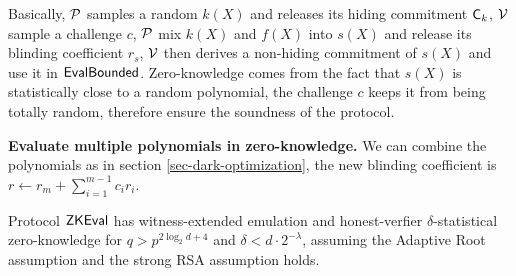 
Basically, $\mathcal{P}$ samples a random $k(X)$ and releases its hiding commitment $\mathsf{C}_k$, $\mathcal{V}$ sample a challenge $c$, $\mathcal{P}$ mix $k(X)$ and $f(X)$ into $s(X)$ and release its blinding coefficient $r_s$, $\mathcal{V}$ then derives a non-hiding commitment of $s(X)$ and use it in $\mathsf{EvalBounded}$. Zero-knowledge comes from the fact that $s(X)$ is statistically close to a random polynomial, the challenge $c$ keeps it from being totally random, therefore ensure the soundness of the protocol.

\textbf{Evaluate multiple polynomials in zero-knowledge.} We can combine the polynomials as in section \ref{sec-dark-optimization}, the new blinding coefficient is $r \gets r_m + \sum_{i=1}^{m-1} c_i r_i$.

\begin{theorem}
Protocol $\mathsf{ZKEval}$ has \textup{witness-extended emulation} and \textup{honest-verfier $\delta$-statistical zero-knowledge} for $q > p^{2 \log_2 d + 4}$ and $\delta < d \cdot 2^{-\lambda}$, assuming the Adaptive Root assumption and the strong RSA assumption holds.
\end{theorem}

